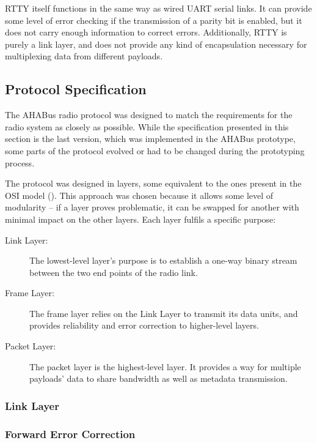 RTTY itself functions in the same way as wired UART serial links. It can provide
some level of error checking if the transmission of a parity bit is enabled, but
it does not carry enough information to correct errors. Additionally, RTTY is
purely a link layer, and does not provide any kind of encapsulation necessary
for multiplexing data from different payloads.

\subsection{Protocol Specification}

The AHABus radio protocol was designed to match the requirements for the radio
system as closely as possible. While the specification presented in this section
is the last version, which was implemented in the AHABus prototype, some parts
of the protocol evolved or had to be changed during the prototyping process.

The protocol was designed in layers, some equivalent to the ones present in the
OSI model (\cite{Stallings1987}). This approach was chosen because it allows
some level of modularity – if a layer proves problematic, it can be swapped
for another with minimal impact on the other layers. Each layer fulfils a
specific purpose:

\begin{description}
\item[Link Layer:] The lowest-level layer's purpose is to establish a one-way
binary stream between the two end points of the radio link.

\item[Frame Layer:] The frame layer relies on the Link Layer to transmit its
data units, and provides reliability and error correction to higher-level 
layers.

\item[Packet Layer:] The packet layer is the highest-level layer. It provides
a way for multiple payloads' data to share bandwidth as well as metadata
transmission.
\end{description}



\subsubsection{Link Layer}

\subsubsection{Forward Error Correction}

